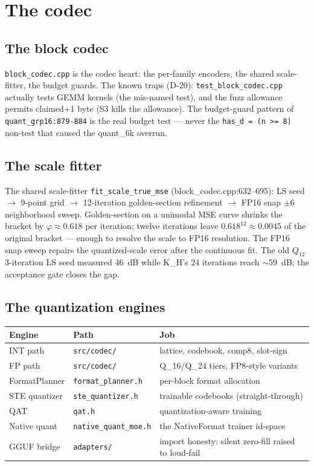 \chapter{The codec}

\section{The block codec}

\texttt{block\_codec.cpp} is the codec heart: the per-family encoders, the shared scale-fitter,
the budget guards. The known traps (D-20): \texttt{test\_block\_codec.cpp} actually tests GEMM
kernels (the mis-named test), and the fuzz allowance permits claimed+1 byte (S3 kills the
allowance). The budget-guard pattern of \texttt{quant\_grp16:879-884} is the real budget test ---
never the \texttt{has\_d = (n >= 8)} non-test that caused the quant\_6k overrun.

\section{The scale fitter}

The shared scale-fitter \texttt{fit\_scale\_true\_mse} (block\_codec.cpp:632--695): LS seed
$\to$ 9-point grid $\to$ 12-iteration golden-section refinement $\to$ FP16 snap $\pm6$
neighborhood sweep. Golden-section on a unimodal MSE curve shrinks the bracket by
$\varphi \approx 0.618$ per iteration; twelve iterations leave $0.618^{12} \approx 0.0045$ of
the original bracket --- enough to resolve the scale to FP16 resolution. The FP16 snap sweep
repairs the quantized-scale error after the continuous fit. The old $Q_{12}$ 3-iteration LS
seed measured 46~dB while K\_H's 24 iterations reach ${\sim}59$~dB; the acceptance gate closes
the gap.

\section{The quantization engines}

\begin{tabular}{@{}lll@{}}
\toprule
Engine & Path & Job\\
\midrule
INT path & \texttt{src/codec/} & lattice, codebook, comp8, slot-sign\\
FP path & \texttt{src/codec/} & Q\_16/Q\_24 tiers, FP8-style variants\\
FormatPlanner & \texttt{format\_planner.h} & per-block format allocation\\
STE quantizer & \texttt{ste\_quantizer.h} & trainable codebooks (straight-through)\\
QAT & \texttt{qat.h} & quantization-aware training\\
Native quant & \texttt{native\_quant\_moe.h} & the NativeFormat trainer id-space\\
GGUF bridge & \texttt{adapters/} & import honesty: silent zero-fill raised to loud-fail\\
\bottomrule
\end{tabular}

